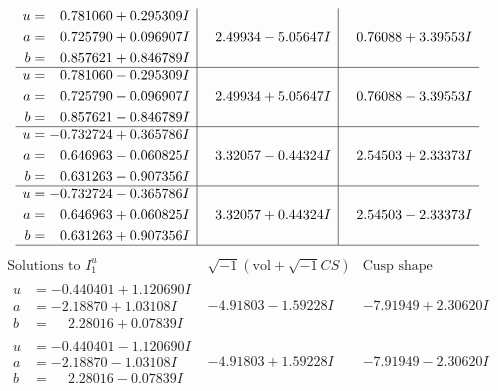 \documentclass[1p]{elsarticle_modified}
\theoremstyle{definition}
\newcommand{\I}{\sqrt{-1}}
\begin{document}
$$\begin{array}{c|c|c}
\begin{aligned}
u &= \phantom{-}0.781060 + 0.295309 I \\
a &= \phantom{-}0.725790 + 0.096907 I \\
b &= \phantom{-}0.857621 + 0.846789 I\end{aligned}
 & \phantom{-}2.49934 - 5.05647 I & \phantom{-}0.76088 + 3.39553 I \\ \hline\begin{aligned}
u &= \phantom{-}0.781060 - 0.295309 I \\
a &= \phantom{-}0.725790 - 0.096907 I \\
b &= \phantom{-}0.857621 - 0.846789 I\end{aligned}
 & \phantom{-}2.49934 + 5.05647 I & \phantom{-}0.76088 - 3.39553 I \\ \hline\begin{aligned}
u &= -0.732724 + 0.365786 I \\
a &= \phantom{-}0.646963 - 0.060825 I \\
b &= \phantom{-}0.631263 - 0.907356 I\end{aligned}
 & \phantom{-}3.32057 - 0.44324 I & \phantom{-}2.54503 + 2.33373 I \\ \hline\begin{aligned}
u &= -0.732724 - 0.365786 I \\
a &= \phantom{-}0.646963 + 0.060825 I \\
b &= \phantom{-}0.631263 + 0.907356 I\end{aligned}
 & \phantom{-}3.32057 + 0.44324 I & \phantom{-}2.54503 - 2.33373 I\\
 \hline 
 \end{array}$$\newpage$$\begin{array}{c|c|c}  
\text{Solutions to }I^u_{1}& \I (\text{vol} + \sqrt{-1}CS) & \text{Cusp shape}\\
 \hline 
\begin{aligned}
u &= -0.440401 + 1.120690 I \\
a &= -2.18870 + 1.03108 I \\
b &= \phantom{-}2.28016 + 0.07839 I\end{aligned}
 & -4.91803 - 1.59228 I & -7.91949 + 2.30620 I \\ \hline\begin{aligned}
u &= -0.440401 - 1.120690 I \\
a &= -2.18870 - 1.03108 I \\
b &= \phantom{-}2.28016 - 0.07839 I\end{aligned}
 & -4.91803 + 1.59228 I & -7.91949 - 2.30620 I \\ \hline\begin{aligned}

\end{aligned}
\end{array}$$
\end{document}
